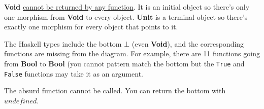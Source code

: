 \documentclass[]{article}
\newcommand{\parx}{\par\noindent}
\begin{document}
\noindent\textbf{Void} \href{https://stackoverflow.com/questions/38553622/inverse-of-the-absurd-function}{cannot be returned by any function}. It is an initial object so there's only one morphism from \textbf{Void} to every object.
\noindent\textbf{Unit} is a terminal object so there's exactly one morphism for every object that points to it.\\ 

\parx The Haskell types include the bottom $\bot$ (even \textbf{Void}), and the corresponding functions are missing from the diagram. For example, there are 11 functions going from \textbf{Bool} to \textbf{Bool} (you cannot pattern match the bottom but the \texttt{True} and \texttt{False} functions may take it as an argument.\\

\parx The absurd function cannot be called. You can return the bottom with $undefined$.
\end{document}
